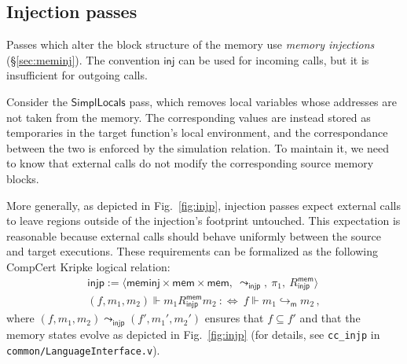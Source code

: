 \documentclass[sigplan,10pt,review,anonymous]{acmart}
\newcommand{\kw}[1]{\ensuremath{ \mathsf{#1} }}
\begin{document}

\subsection{Injection passes} \label{sec:pass:inj} %

Passes which alter the block structure of the memory
use \emph{memory injections} (\S\ref{sec:meminj}).
The convention \kw{inj} can be used for incoming calls,
but it is insufficient for outgoing calls.

Consider the \kw{SimplLocals} pass,
which removes local variables whose addresses are not taken
from the memory.
The corresponding values are instead stored
as temporaries in the target function's local environment,
and the correspondance between the two
is enforced by the simulation relation.
To maintain it,
we need to know that
external calls do not modify
the corresponding source memory blocks.

More generally,
as depicted in Fig.~\ref{fig:injp},
injection passes expect external calls
to leave regions outside of the injection's footprint untouched.
This expectation is reasonable because
external calls
should behave uniformly between the source and target executions.
These requirements can be formalized as the
following CompCert Kripke logical relation:
\begin{gather*}
  \kw{injp} :=
    \langle
      \kw{meminj} \times \kw{mem} \times \kw{mem}, \:
      {\leadsto_\kw{injp}}, \:
      \pi_1, \:
      R^\kw{mem}_\kw{injp}
    \rangle
  \\
  (f, m_1, m_2) \Vdash m_1 \mathrel{R^\kw{mem}_\kw{injp}} m_2
  \: :\Leftrightarrow \:
  f \Vdash m_1 \hookrightarrow_\kw{m} m_2 \,,
\end{gather*}
where $(f, m_1, m_2) \leadsto_\kw{injp} (f', m_1', m_2')$
ensures that $f \subseteq f'$ and that the memory states
evolve as depicted in Fig.~\ref{fig:injp}
(for details,
see \texttt{cc\_injp} in \texttt{common/LanguageInterface.v}).
\end{document}
